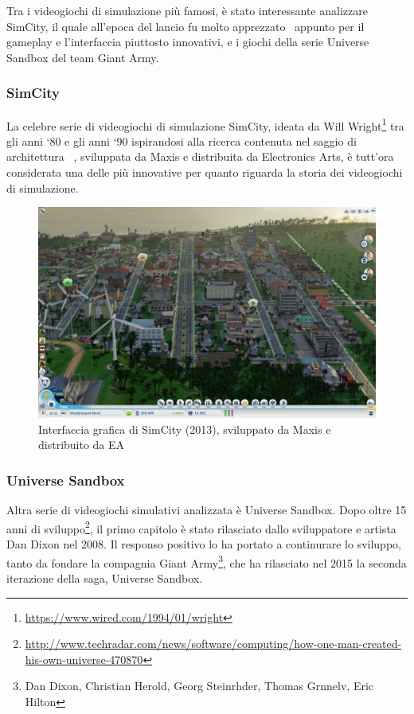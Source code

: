             Tra i videogiochi di simulazione più famosi, è stato interessante analizzare SimCity, il quale all'epoca del lancio fu molto apprezzato~\cite{friedman1995} appunto per il gameplay e l'interfaccia piuttosto innovativi, e i giochi della serie Universe Sandbox del team Giant Army.

            \subsubsection{SimCity}\label{subsub:simcity}
                La celebre serie di videogiochi di simulazione SimCity, ideata da Will Wright\footnote{\url{https://www.wired.com/1994/01/wright}} tra gli anni `80 e gli anni `90 ispirandosi alla ricerca contenuta nel saggio di architettura ~\cite{aPatternLanguage}, sviluppata da Maxis e distribuita da Electronics Arts, è tutt'ora considerata una delle più innovative per quanto riguarda la storia dei videogiochi di simulazione.

                \begin{figure}[htbp]
                    \centering
                    \includegraphics[scale=0.35]{img/SimCity}
                    \caption{Interfaccia grafica di SimCity (2013), sviluppato da Maxis e distribuito da EA}
                    \label{fig:simcity}
                \end{figure}


            \subsubsection{Universe Sandbox}\label{subsub:universesandbox}
                Altra serie di videogiochi simulativi analizzata è Universe Sandbox.
                Dopo oltre 15 anni di sviluppo\footnote{\url{http://www.techradar.com/news/software/computing/how-one-man-created-his-own-universe-470870}}, il primo capitolo è stato rilasciato dallo sviluppatore e artista Dan Dixon nel 2008.
                Il responso positivo lo ha portato a continurare lo sviluppo, tanto da fondare la compagnia Giant Army\footnote{Dan Dixon, Christian Herold, Georg Steinrhder, Thomas Grnnelv, Eric Hilton}, che ha rilasciato nel 2015 la seconda iterazione della saga, Universe Sandbox.

